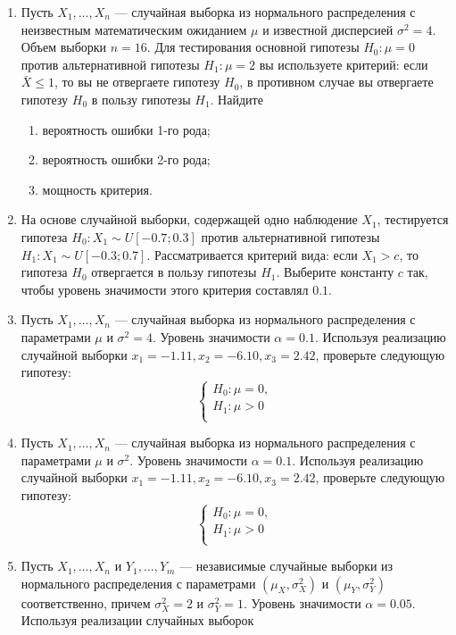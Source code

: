 \begin{enumerate}
\item Пусть $X_{1}, \ldots, X_{n}$ — случайная выборка из нормального распределения
с неизвестным математическим ожиданием $\mu$ и известной дисперсией $\sigma^2 = 4$.
Объем выборки $n = 16$. Для тестирования основной гипотезы $H_{0}:\mu = 0$ против
альтернативной гипотезы $H_{1}:\mu = 2$ вы используете критерий: если $\bar{X} \leq 1$,
то вы не отвергаете гипотезу $H_{0}$,
в противном случае вы отвергаете гипотезу $H_{0}$ в пользу гипотезы $H_{1}$. Найдите

\begin{enumerate}
   \item  вероятность ошибки 1-го рода;
   \item вероятность ошибки 2-го рода;
   \item мощность критерия.
\end{enumerate}


\item На основе случайной выборки, содержащей одно наблюдение $X_{1}$,
тестируется гипотеза $H_{0} : X_{1} \sim U[-0.7;0.3]$ против альтернативной гипотезы
$H_{1}: X_{1} \sim U[-0.3;0.7]$.
Рассматривается критерий вида: если $X_{1} > c$,
то гипотеза $H_{0}$ отвергается в пользу гипотезы $H_{1}$.
Выберите константу $c$ так, чтобы уровень значимости этого критерия составлял $0.1$.

\item Пусть $X_{1}, \ldots, X_{n}$ — случайная выборка из нормального распределения
с параметрами $\mu$ и $\sigma^2 = 4$.
Уровень значимости  $\alpha = 0.1$.
Используя реализацию случайной выборки $x_{1} = -1.11, x_{2} = -6.10, x_{3} = 2.42$,
проверьте следующую гипотезу:
\[
\begin{cases}
H_{0}:\mu = 0, \\
H_{1}:\mu > 0 \\
\end{cases}
\]

\item Пусть $X_{1}, \ldots, X_{n}$ — случайная выборка из нормального
распределения с параметрами $\mu$ и $\sigma^2$.
Уровень значимости  $\alpha = 0.1$.
Используя реализацию случайной выборки $x_{1} = -1.11, x_{2} = -6.10, x_{3} = 2.42$,
проверьте следующую гипотезу:
\[
\begin{cases}
H_{0}:\mu = 0, \\
H_{1}:\mu > 0 \\
\end{cases}
\]

\item Пусть $X_{1}, \ldots, X_{n}$ и $Y_{1}, \ldots, Y_{m}$ —
независимые случайные выборки из нормального распределения
с параметрами $(\mu_{X},\sigma^2_{X})$ и $(\mu_{Y},\sigma^2_{Y})$ соответственно,
причем  $\sigma^2_{X} = 2$ и $\sigma^2_{Y} = 1$. Уровень значимости $\alpha = 0.05$.
Используя реализации случайных выборок


\end{enumerate}
